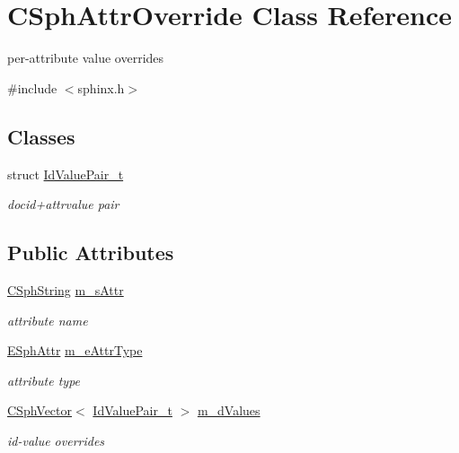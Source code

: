 \hypertarget{classCSphAttrOverride}{\section{C\-Sph\-Attr\-Override Class Reference}
\label{classCSphAttrOverride}
}


per-\/attribute value overrides  




{\ttfamily \#include $<$sphinx.\-h$>$}

\subsection*{Classes}
\begin{DoxyCompactItemize}
\item 
struct \hyperlink{structCSphAttrOverride_1_1IdValuePair__t}{Id\-Value\-Pair\-\_\-t}
\begin{DoxyCompactList}\small\item\em docid+attrvalue pair \end{DoxyCompactList}\end{DoxyCompactItemize}
\subsection*{Public Attributes}
\begin{DoxyCompactItemize}
\item 
\hyperlink{structCSphString}{C\-Sph\-String} \hyperlink{classCSphAttrOverride_a045be0fe83269393a9a240744f9f839d}{m\-\_\-s\-Attr}
\begin{DoxyCompactList}\small\item\em attribute name \end{DoxyCompactList}\item 
\hyperlink{sphinxexpr_8h_aa883df0db2e4468a107fdd2d2ae625a3}{E\-Sph\-Attr} \hyperlink{classCSphAttrOverride_a419e58c7300c784e43d7bbc2af646da6}{m\-\_\-e\-Attr\-Type}
\begin{DoxyCompactList}\small\item\em attribute type \end{DoxyCompactList}\item 
\hyperlink{classCSphVector}{C\-Sph\-Vector}$<$ \hyperlink{structCSphAttrOverride_1_1IdValuePair__t}{Id\-Value\-Pair\-\_\-t} $>$ \hyperlink{classCSphAttrOverride_a6e4dbed6645cc989de28563748f09299}{m\-\_\-d\-Values}
\begin{DoxyCompactList}\small\item\em id-\/value overrides \end{DoxyCompactList}\end{DoxyCompactItemize}



